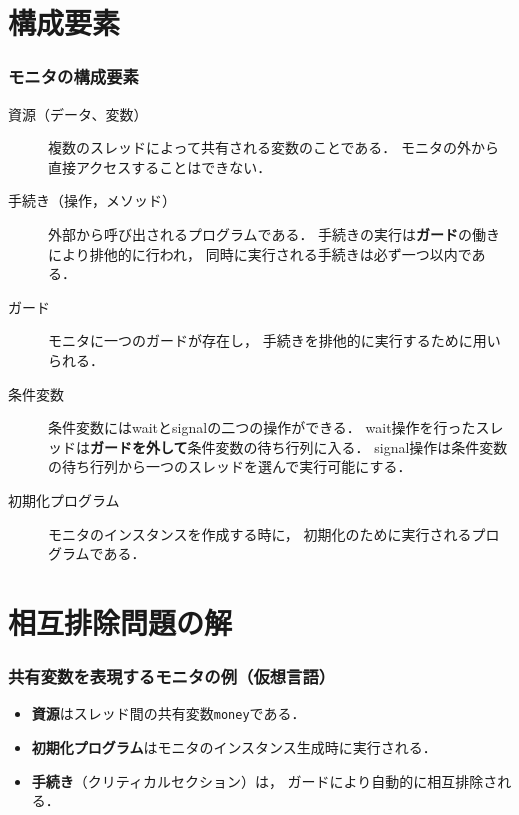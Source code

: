 \documentclass[dvipdfmx]{beamer}
\begin{document}
\section{構成要素}
\begin{frame}
  \frametitle{モニタの構成要素}
\begin{description}
\item [資源（データ、変数）]
複数のスレッドによって共有される変数のことである．
モニタの外から直接アクセスすることはできない．

\item [手続き（操作，メソッド）]
外部から呼び出されるプログラムである．
手続きの実行は{\bf ガード}の働きにより排他的に行われ，
同時に実行される手続きは必ず一つ以内である．

\item [ガード]
モニタに一つのガードが存在し，
手続きを排他的に実行するために用いられる．

\item [条件変数]
条件変数にはwaitとsignalの二つの操作ができる．
wait操作を行ったスレッドは{\bf ガードを外して}条件変数の待ち行列に入る．
signal操作は条件変数の待ち行列から一つのスレッドを選んで実行可能にする．

\item [初期化プログラム]
モニタのインスタンスを作成する時に，
初期化のために実行されるプログラムである．
\end{description}
\end{frame}

\section{相互排除問題の解}
\begin{frame}
  \frametitle{共有変数を表現するモニタの例（仮想言語）}
  

  \begin{itemize}
  \item {\bf 資源}はスレッド間の共有変数{\tt money}である．
  \item {\bf 初期化プログラム}はモニタのインスタンス生成時に実行される．
  \item {\bf 手続き}（クリティカルセクション）は，
    ガードにより自動的に相互排除される．
  \end{itemize}
\end{frame}
\end{document}
